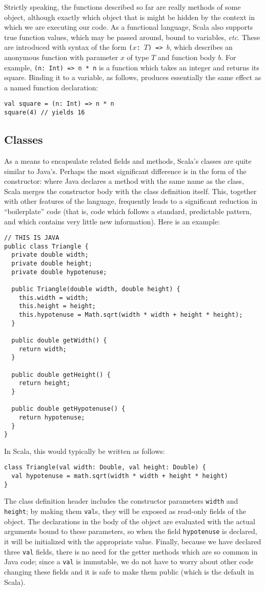 \documentclass[11pt]{article}
\begin{document}
Strictly speaking, the functions described so far are really methods of some object, although exactly which object that is might be hidden by the context in which we are executing our code. As a functional language, Scala also supports true function values, which may be passed around, bound to variables, \textit{etc}. These are introduced with syntax of the form \texttt{($x$:\ $T$) => $b$}, which describes an anonymous function with parameter $x$ of type $T$ and function body $b$. For example, \texttt{(n:\ Int) => n * n} is a function which takes an integer and returns its square. Binding it to a variable, as follows, produces essentially the same effect as a named function declaration:
\begin{verbatim}
val square = (n: Int) => n * n
square(4) // yields 16
\end{verbatim}

\subsection{Classes}
As a means to encapsulate related fields and methods, Scala's classes are quite similar to Java's. Perhaps the most significant difference is in the form of the constructor: where Java declares a method with the same name as the class, Scala merges the constructor body with the class definition itself. This, together with other features of the language, frequently leads to a significant reduction in ``boilerplate'' code (that is, code which follows a standard, predictable pattern, and which contains very little new information). Here is an example:
\begin{verbatim}
// THIS IS JAVA
public class Triangle {
  private double width;
  private double height;
  private double hypotenuse;

  public Triangle(double width, double height) {
    this.width = width;
    this.height = height;
    this.hypotenuse = Math.sqrt(width * width + height * height);
  }

  public double getWidth() {
    return width;
  }

  public double getHeight() {
    return height;
  }

  public double getHypotenuse() {
    return hypotenuse;
  }
}
\end{verbatim}
In Scala, this would typically be written as follows:
\begin{verbatim}
class Triangle(val width: Double, val height: Double) {
  val hypotenuse = math.sqrt(width * width + height * height)
}
\end{verbatim}
The class definition header includes the constructor parameters \texttt{width} and \texttt{height}; by making them \texttt{val}s, they will be exposed as read-only fields of the object. The declarations in the body of the object are evaluated with the actual arguments bound to these parameters, so when the field \texttt{hypotenuse} is declared, it will be initialized with the appropriate value. Finally, because we have declared three \texttt{val} fields, there is no need for the getter methods which are so common in Java code; since a \texttt{val} is immutable, we do not have to worry about other code changing these fields and it is safe to make them public (which is the default in Scala).
\end{document}
